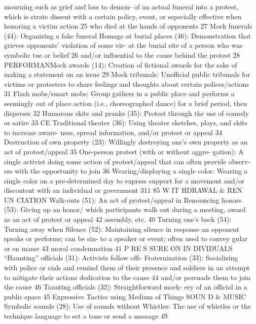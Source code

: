 \documentclass[twoside,a4paper,12pt,fleqn,openany]{extbook}
\begin{document}
mourning such as grief and loss to demon-
 of an actual funeral into a protest, which is
strate dissent with a certain policy, event, or
 especially effective when honoring a victim
action
 25
 who died at the hands of opponents
 27
Mock funerals (44): Organizing a fake funeral
 Homage at burial places (46): Demonstration
that grieves opponents’ violation of some vir-
 at the burial site of a person who was symbolic
tue or belief
 26
 and/or influential to the cause behind the
protest
 28
PERFORMANMock awards (14): Creation of fictional awards
for the sake of making a statement on an
issue
 29
Mock tribunals: Unofficial public tribunals for
victims or protesters to share feelings and
thoughts about certain polices/actions
 31
Flash mobs/smart mobs: Group gathers in a
public place and performs a seemingly out of
place action (i.e., choreographed dance) for a
brief period, then disperses
 32
Humorous skits and pranks (35): Protest
through the use of comedy or satire
 33
CE
Traditional theater (36): Using theater
sketches, plays, and skits to increase aware-
ness, spread information, and/or protest or
appeal
 34
Destruction of own property (23): Willingly
destroying one’s own property as an act of
protest/appeal
 35
One-person protest (with or without aggre-
gation): A single activist doing some action of
protest/appeal that can often provide observ-
ers with the opportunity to join
 36
Wearing/displaying a single color: Wearing a
single color on a pre-determined day to express
support for a movement and/or discontent with
an individual or government
 311
85
W IT HDRAWAL & REN UN CIATION
Walk-outs (51): An act of protest/appeal in
 Renouncing honors (53): Giving up an honor/
which participants walk out during a meeting,
 award as an act of protest or appeal
 42
assembly, etc.
 40
Turning one’s back (54): Turning away when
Silence (52): Maintaining silence in response
 an opponent speaks or performs; can be sin-
to a speaker or event; often used to convey
 gular or en masse
 43
moral condemnation
 41
P RE S SURE ON IN DIVIDUALS
“Haunting” officials (31): Activists follow offi-
 Fraternization (33): Socializing with police or
cials and remind them of their presence and
 soldiers in an attempt to mitigate their actions
dedication to the cause
 44
 and/or persuade them to join the cause 46
Taunting officials (32): Straightforward mock-
ery of an official in a public space
 45
Expressive Tactics using Medium of Things
SOUN D & MUSIC
Symbolic sounds (28): Use of sounds without
 Whistles: The use of whistles or the technique
language to set a tone or send a message 49
\end{document}
